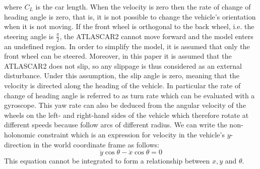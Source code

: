 where $C_L$ is the car length. When the velocity is zero then the rate of change of heading angle is zero, that is, it is not possible to change the vehicle's orientation
when it is not moving. If the front wheel is orthogonal to the back wheel, i.e. the steering angle is $\frac{\pi}{2}$, the ATLASCAR2 cannot move forward and the model enters an undefined region. In order to simplify the model, it is assumed that only the front wheel can be steered. Moreover, in this paper it is assumed that the ATLASCAR2 does not slip, so any slippage is thus considered as an external disturbance. Under this assumption, the slip angle is zero, meaning that the velocity is directed along the heading of the vehicle. In particular the rate of change of heading angle is referred to as turn rate which can be evaluated with a gyroscope. This yaw rate can also be deduced from the angular velocity of the wheels on the left- and right-hand sides of the vehicle which therefore rotate at different speeds because follow arcs of different radius. We can write the non-holonomic constraint which is an expression for velocity in the vehicle's $y$-direction in the world coordinate frame as follows:
\begin{equation}
	\dot{y}\cos\theta-\dot{x}\cos\theta=0
\end{equation}
This equation cannot be integrated to form a
relationship between $x,y$ and $\theta$.



